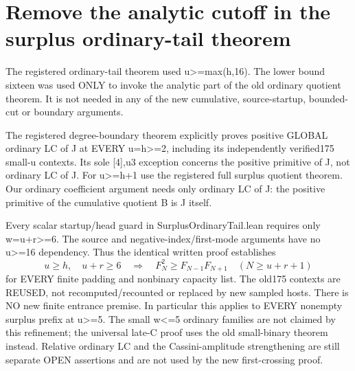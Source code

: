 \section{Remove the analytic cutoff in the surplus ordinary-tail theorem}
The registered ordinary-tail theorem used u>=max(h,16).
The lower bound sixteen was used ONLY to invoke the analytic part
of the old ordinary quotient theorem. It is not needed in any of the
new cumulative, source-startup, bounded-cut or boundary arguments.

The registered degree-boundary theorem explicitly proves positive
GLOBAL ordinary LC of J at EVERY u=h>=2, including its independently
verified175 small-u contexts. Its sole [4],u3 exception concerns the
positive primitive of J, not ordinary LC of J.
For u>=h+1 use the registered full surplus quotient theorem.
Our ordinary coefficient argument needs only ordinary LC of J:
the positive primitive of the cumulative quotient B is J itself.

Every scalar startup/head guard in SurplusOrdinaryTail.lean requires
only w=u+r>=6. The source and negative-index/first-mode arguments have
no u>=16 dependency. Thus the identical written proof establishes
\[
 u\ge h,\quad u+r\ge6
 \quad\Longrightarrow\quad
 F_N^2\ge F_{N-1}F_{N+1}\quad(N\ge u+r+1)
\]
for EVERY finite padding and nonbinary capacity list.
The old175 contexts are REUSED, not recomputed/recounted or replaced
by new sampled hosts. There is NO new finite entrance premise.
In particular this applies to EVERY nonempty surplus prefix at u>=5.
The small w<=5 ordinary families are not claimed by this refinement;
the universal late-C proof uses the old small-binary theorem instead.
Relative ordinary LC and the Cassini-amplitude strengthening are still
separate OPEN assertions and are not used by the new first-crossing proof.


